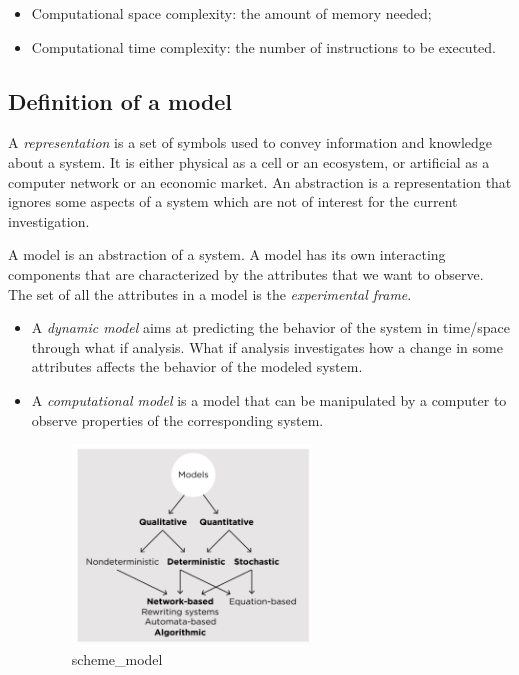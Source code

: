 \begin{itemize}
\tightlist
\item
  Computational space complexity: the amount of memory needed;
\item
  Computational time complexity: the number of instructions to be
  executed.
\end{itemize}

\hypertarget{definition-of-a-model}{%
\subsection{Definition of a model}\label{definition-of-a-model}}

A \emph{representation} is a set of symbols used to convey information
and knowledge about a system. It is either physical as a cell or an
ecosystem, or artificial as a computer network or an economic market. An
abstraction is a representation that ignores some aspects of a system
which are not of interest for the current investigation.

A model is an abstraction of a system. A model has its own interacting
components that are characterized by the attributes that we want to
observe. The set of all the attributes in a model is the
\emph{experimental frame}.

\begin{itemize}
\item
  A \emph{dynamic model} aims at predicting the behavior of the system
  in time/space through what if analysis. What if analysis investigates
  how a change in some attributes affects the behavior of the modeled
  system.
\item
  A \emph{computational model} is a model that can be manipulated by a
  computer to observe properties of the corresponding system.

  \begin{figure}
  \centering
  \includegraphics[width=0.6\textwidth]{scheme_model.png}
  \caption{scheme\_model}
  \end{figure}
\end{itemize}

